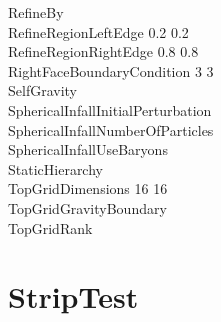 \documentclass{book}
\begin{document}
{\begin{tabbing}
\> RefineBy                             \\
\> RefineRegionLeftEdge             0.2 0.2  \\
\> RefineRegionRightEdge            0.8 0.8  \\
\> RightFaceBoundaryCondition  3 3 \\
\> SelfGravity                        \\
\> SphericalInfallInitialPerturbation  \\
\> SphericalInfallNumberOfParticles    \\
\> SphericalInfallUseBaryons           \\
\> StaticHierarchy                      \\
\> TopGridDimensions           16 16 \\
\> TopGridGravityBoundary             \\
\> TopGridRank                
\end{tabbing}}


\subsection{\cello}

\section{StripTest} \label{s:StripTest}

\subsection{\enzo}
\end{document}
